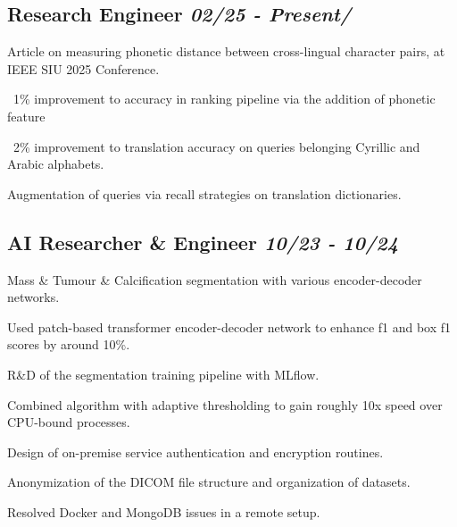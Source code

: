 \documentclass[letter, 14pt]{article}
\begin{document}
\subsection{Research Engineer \hfill \textit{\textmd{02/25 - Present/}}}
\begin{zitemize}
\item Article on measuring phonetic distance between cross-lingual character pairs, at IEEE SIU 2025 Conference. \href{https://ieeexplore.ieee.org/abstract/document/11112305}{\color{black}\externallink} \\
\item ~1\% improvement to accuracy in ranking pipeline via the addition of phonetic feature
\item ~2\% improvement to translation accuracy on queries belonging Cyrillic and Arabic alphabets.
\item Augmentation of queries via recall strategies on translation dictionaries.
\end{zitemize}

\subsection{AI Researcher \& Engineer \hfill \textit{\textmd{10/23 - 10/24}}}
\begin{zitemize}
\item Mass \& Tumour \& Calcification segmentation with various encoder-decoder networks.
\item Used patch-based transformer encoder-decoder network to enhance f1 and box f1 scores by around 10\%.
\item R\&D of the segmentation training pipeline with MLflow.
\item Combined \href{https://www.epfl.ch/labs/ivrl/research/slic-superpixels/}{\color{black}{SLIC}} algorithm with adaptive thresholding to gain roughly 10x speed over CPU-bound processes.
\item Design of on-premise service authentication and encryption routines.
\item Anonymization of the DICOM file structure and organization of datasets.
\item Resolved Docker and MongoDB issues in a remote setup. 
\end{zitemize}
\end{document}
